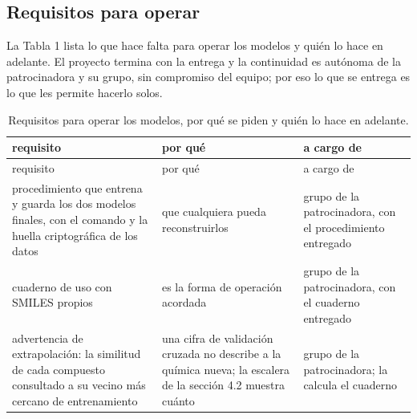 \documentclass[letterpaper,11pt]{article}
\begin{document}
\subsection{Requisitos para operar}

La Tabla 1 lista lo que hace falta para operar los modelos y quién lo hace en adelante. El proyecto termina con la entrega y la continuidad es autónoma de la patrocinadora y su grupo, sin compromiso del equipo; por eso lo que se entrega es lo que les permite hacerlo solos.

\begin{longtable}[]{@{}
  >{\raggedright\arraybackslash}p{}
  >{\raggedright\arraybackslash}p{}
  >{\raggedright\arraybackslash}p{}@{}}
\caption{Requisitos para operar los modelos, por qué se piden y quién lo hace en adelante.}\tabularnewline
\toprule\noalign{}
\begin{minipage}[b]{\linewidth}\raggedright
requisito
\end{minipage} & \begin{minipage}[b]{\linewidth}\raggedright
por qué
\end{minipage} & \begin{minipage}[b]{\linewidth}\raggedright
a cargo de
\end{minipage} \\
\midrule\noalign{}
\endfirsthead
\toprule\noalign{}
\begin{minipage}[b]{\linewidth}\raggedright
requisito
\end{minipage} & \begin{minipage}[b]{\linewidth}\raggedright
por qué
\end{minipage} & \begin{minipage}[b]{\linewidth}\raggedright
a cargo de
\end{minipage} \\
\midrule\noalign{}
\endhead
\bottomrule\noalign{}
\endlastfoot
procedimiento que entrena y guarda los dos modelos finales, con el comando y la huella criptográfica de los datos & que cualquiera pueda reconstruirlos & grupo de la patrocinadora, con el procedimiento entregado \\
cuaderno de uso con SMILES propios & es la forma de operación acordada & grupo de la patrocinadora, con el cuaderno entregado \\
advertencia de extrapolación: la similitud de cada compuesto consultado a su vecino más cercano de entrenamiento & una cifra de validación cruzada no describe a la química nueva; la escalera de la sección 4.2 muestra cuánto & grupo de la patrocinadora; la calcula el cuaderno \\

\end{longtable}
\end{document}
